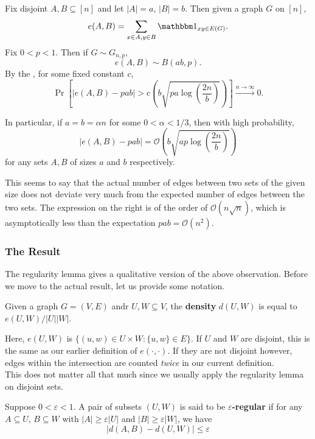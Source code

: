 			Fix disjoint $A, B \subseteq [n]$ and let $|A|=a$, $|B|=b$. Then given a graph $G$ on $[n]$,
			\[ e(A,B) = \sum_{x \in A, y \in B} \indic_{xy \in E(G)}. \]
			Fix $0<p<1$. Then if $G \sim G_{n,p}$,
			\[ e(A,B) \sim B\left( ab, p \right). \]
			By the , for some fixed constant $c$,
			\[ \Pr\left[ |e(A,B) - pab| > c \left(b\sqrt{pa\log\left(\frac{2n}{b}\right)}\right) \right] \xrightarrow{n\to\infty} 0. \]

			In particular, if $a = b = \alpha n$ for some $0 < \alpha < 1/3$, then with high probability,
			\[ |e(A,B) - pab| = \mathcal{O}\left(b\sqrt{ap\log\left(\frac{2n}{b}\right)}\right) \]
			for any sets $A, B$ of sizes $a$ and $b$ respectively.

			This seems to say that the actual number of edges between two sets of the given size does not deviate very much from the expected number of edges between the two sets. The expression on the right is of the order of $\mathcal{O}(n\sqrt{n})$, which is asymptotically less than the expectation $pab = \mathcal{O}(n^2)$.

		\subsubsection{The Result}

			The regularity lemma gives a qualitative version of the above observation. Before we move to the actual result, let us provide some notation.

			\begin{fdef}[Density]
				Given a graph $G = (V,E)$ andr $U,W \subseteq V$, the \textbf{density} $d(U,W)$ is equal to $e(U,W) / |U||W|$.
			\end{fdef}

			\begin{remark}
				Here, $e(U,W)$ is $\{(u,w) \in U \times W : \{u,w\} \in E\}$. If $U$ and $W$ are disjoint, this is the same as our earlier definition of $e(\cdot,\cdot)$. If they are not disjoint however, edges within the intersection are counted \emph{twice} in our current definition.\\
				This does not matter all that much since we usually apply the regularity lemma on disjoint sets.
			\end{remark}

			\begin{fdef}
				Suppose $0 < \varepsilon < 1$. A pair of subsets $(U,W)$ is said to be \textbf{$\varepsilon$-regular} if for any $A \subseteq U$, $B\subseteq W$ with $|A| \ge \varepsilon |U|$ and $|B| \ge \varepsilon |W|$, we have
				\[ |d(A,B) - d(U,W)| \le \varepsilon \]
			\end{fdef}


